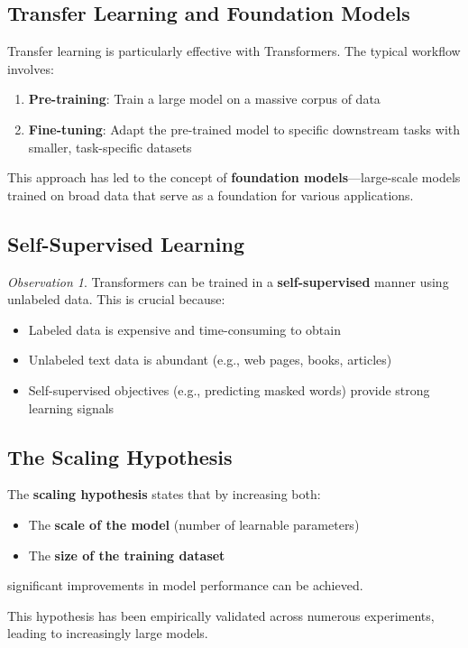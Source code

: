 \documentclass[11pt,a4paper]{article}
\theoremstyle{definition}
\theoremstyle{plain}
\theoremstyle{remark}
\newtheorem*{observation}{Observation}
\begin{document}
\subsection{Transfer Learning and Foundation Models}

\begin{tcolorbox}[colback=yellow!10!white,colframe=yellow!75!black,title=\textbf{Transfer Learning with Transformers}]
Transfer learning is particularly effective with Transformers. The typical workflow involves:
\begin{enumerate}
    \item \textbf{Pre-training}: Train a large model on a massive corpus of data
    \item \textbf{Fine-tuning}: Adapt the pre-trained model to specific downstream tasks with smaller, task-specific datasets
\end{enumerate}

This approach has led to the concept of \textbf{foundation models}—large-scale models trained on broad data that serve as a foundation for various applications.
\end{tcolorbox}

\subsection{Self-Supervised Learning}

\begin{observation}
Transformers can be trained in a \textbf{self-supervised} manner using unlabeled data. This is crucial because:
\begin{itemize}
    \item Labeled data is expensive and time-consuming to obtain
    \item Unlabeled text data is abundant (e.g., web pages, books, articles)
    \item Self-supervised objectives (e.g., predicting masked words) provide strong learning signals
\end{itemize}
\end{observation}

\subsection{The Scaling Hypothesis}

\begin{tcolorbox}[colback=teal!10!white,colframe=teal!75!black,title=\textbf{Scaling Hypothesis}]
The \textbf{scaling hypothesis} states that by increasing both:
\begin{itemize}
    \item The \textbf{scale of the model} (number of learnable parameters)
    \item The \textbf{size of the training dataset}
\end{itemize}
significant improvements in model performance can be achieved.

This hypothesis has been empirically validated across numerous experiments, leading to increasingly large models.
\end{tcolorbox}
\end{document}
